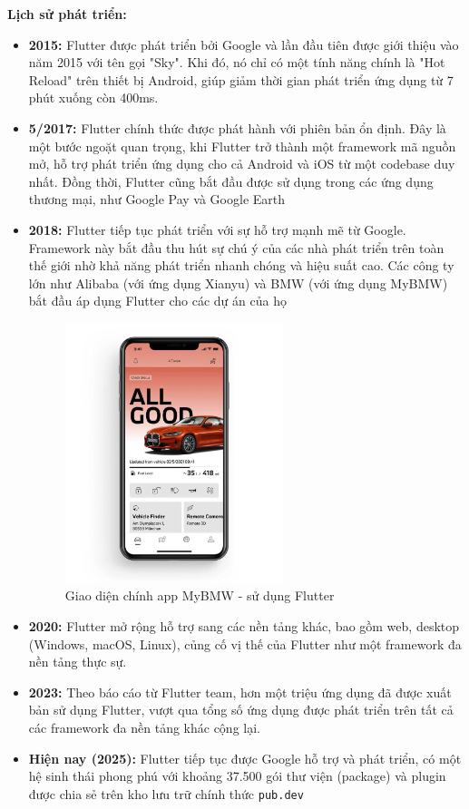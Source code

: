 \documentclass[../DoAn.tex]{subfiles}
\numberwithin{figure}{chapter}
\begin{document}
\textbf{Lịch sử phát triển:}  
\begin{itemize}
    \item \textbf{2015: } Flutter được phát triển bởi Google và lần đầu tiên được giới thiệu vào năm 2015 với tên gọi "Sky". Khi đó, nó chỉ có một tính năng chính là "Hot Reload" trên thiết bị Android, giúp giảm thời gian phát triển ứng dụng từ 7 phút xuống còn 400ms.
    \item \textbf{5/2017: } Flutter chính thức được phát hành với phiên bản ổn định. Đây là một bước ngoặt quan trọng, khi Flutter trở thành một framework mã nguồn mở, hỗ trợ phát triển ứng dụng cho cả Android và iOS từ một codebase duy nhất. Đồng thời, Flutter cũng bắt đầu được sử dụng trong các ứng dụng thương mại, như Google Pay và Google Earth
    \item \textbf{2018: } Flutter tiếp tục phát triển với sự hỗ trợ mạnh mẽ từ Google. Framework này bắt đầu thu hút sự chú ý của các nhà phát triển trên toàn thế giới nhờ khả năng phát triển nhanh chóng và hiệu suất cao. Các công ty lớn như Alibaba (với ứng dụng Xianyu) và BMW (với ứng dụng MyBMW) bắt đầu áp dụng Flutter cho các dự án của họ
    \begin{figure}[H]
        \centering
        \includegraphics[width=0.6\textwidth]{Hinhve/Chuong5/mybmw.jpg}
        \caption{Giao diện chính app MyBMW - sử dụng Flutter}
        \label{fig:mybmw}
    \end{figure}
    \item \textbf{2020: } Flutter mở rộng hỗ trợ sang các nền tảng khác, bao gồm web, desktop (Windows, macOS, Linux), củng cố vị thế của Flutter như một framework đa nền tảng thực sự.
    \item \textbf{2023: } Theo báo cáo từ Flutter team, hơn một triệu ứng dụng đã được xuất bản sử dụng Flutter, vượt qua tổng số ứng dụng được phát triển trên tất cả các framework đa nền tảng khác cộng lại.
    \item \textbf{Hiện nay (2025): } Flutter tiếp tục được Google hỗ trợ và phát triển, có một hệ sinh thái phong phú với khoảng 37.500 gói thư viện (package) và plugin được chia sẻ trên kho lưu trữ chính thức \texttt{pub.dev}
\end{itemize}
\end{document}
